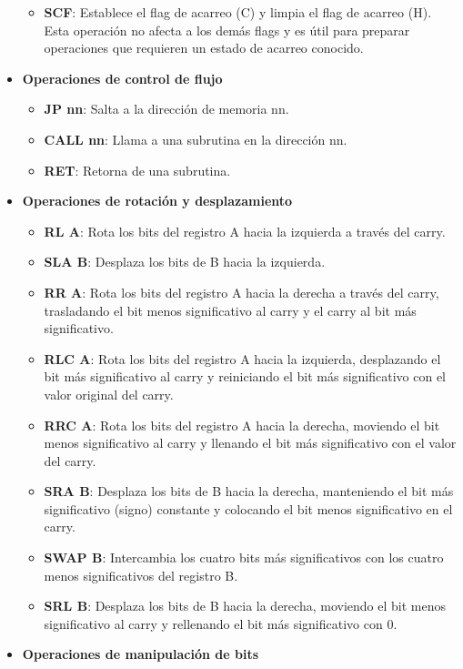 \begin{itemize}
\begin{itemize}
  \item \textbf{SCF}: Establece el flag de acarreo (C) y limpia el flag de acarreo (H). Esta operación no afecta a los demás flags y es útil para preparar operaciones que requieren un estado de acarreo conocido.
  \end{itemize}
  \item \textbf{Operaciones de control de flujo}
  \begin{itemize}
  \item \textbf{JP nn}: Salta a la dirección de memoria nn.
  \item \textbf{CALL nn}: Llama a una subrutina en la dirección nn.
  \item \textbf{RET}: Retorna de una subrutina.
  \end{itemize}
  \item \textbf{Operaciones de rotación y desplazamiento}
  \begin{itemize}
  \item \textbf{RL A}: Rota los bits del registro A hacia la izquierda a través del carry.
  \item \textbf{SLA B}: Desplaza los bits de B hacia la izquierda.
  \item \textbf{RR A}: Rota los bits del registro A hacia la derecha a través del carry, trasladando el bit menos significativo al carry y el carry al bit más significativo.
  \item \textbf{RLC A}: Rota los bits del registro A hacia la izquierda, desplazando el bit más significativo al carry y reiniciando el bit más significativo con el valor original del carry.
  \item \textbf{RRC A}: Rota los bits del registro A hacia la derecha, moviendo el bit menos significativo al carry y llenando el bit más significativo con el valor del carry.
  \item \textbf{SRA B}: Desplaza los bits de B hacia la derecha, manteniendo el bit más significativo (signo) constante y colocando el bit menos significativo en el carry.
  \item \textbf{SWAP B}: Intercambia los cuatro bits más significativos con los cuatro menos significativos del registro B.
  \item \textbf{SRL B}: Desplaza los bits de B hacia la derecha, moviendo el bit menos significativo al carry y rellenando el bit más significativo con 0.
  \end{itemize}
  \item \textbf{Operaciones de manipulación de bits}
  \begin{itemize}

\end{itemize}
\end{itemize}
